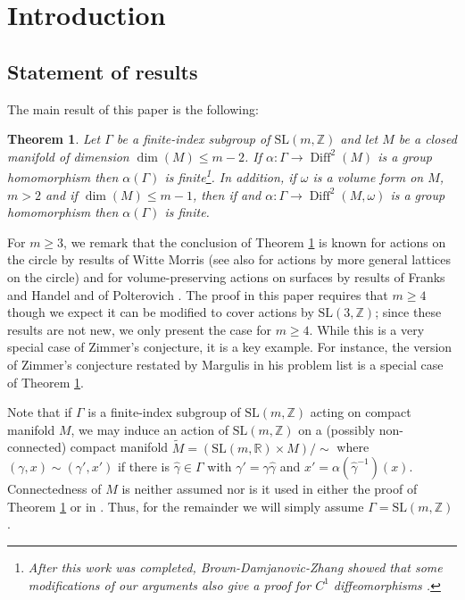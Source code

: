 \documentclass[10pt,reqno]{amsart}
\theoremstyle{Theorem}
\newtheorem{custheorem}{Theorem}
\theoremstyle{definition}
\theoremstyle{remark}
\newcommand{\note}[1]{\marginpar{{\color{red}\footnotesize \begin{spacing}{1}#1\end{spacing}}}}
\newcommand{\td}{\tilde}
\DeclareMathOperator{\Diff}{Diff}
\newcommand{\R}{\mathbb {R}}
\newcommand{\Z}{\mathbb {Z}}
\newcommand{\Sl}{\mathrm{SL}}
\newcommand{\inv}{^{-1}}
\begin{document}
\section{Introduction}
\subsection{Statement of results}
The main result of this paper is the following:

\begin{custheorem}\label{main1} Let $\Gamma$ be a finite-index subgroup of $\Sl(m,\Z)$ and  let $M$ be a closed manifold of dimension $\dim(M) \leq m - 2$.  If  $\alpha\colon \Gamma \to \Diff^2(M)$ is a group homomorphism  then $\alpha(\Gamma)$ is finite\footnote{After this work was completed, Brown-Damjanovic-Zhang showed that some modifications of our arguments also give a proof for $C^1$ diffeomorphisms \cite{BDZ}.}.  In addition, if $\omega$ is a volume form on $M$, $m>2$ and if $\dim(M) \leq m-1$, then if and $\alpha\colon \Gamma \to \Diff^2(M, \omega)$ is a group homomorphism then $\alpha(\Gamma)$ is finite.
\end{custheorem}


For $m\ge 3$, we remark that the conclusion of Theorem \ref{main1} is known for actions on the circle by results of Witte Morris  \cite{MR1198459} (see also \cite{MR1703323,MR1911660} for actions by more general lattices on the circle) and for volume-preserving actions on surfaces by results of Franks and Handel and of Polterovich  \cite{MR2219247, MR1946555}.   The proof in this paper  requires that $m\ge 4$ though we expect it can be modified to cover actions by $\Sl(3,\Z)$; since these results are not new, we only present the case for $m\ge 4$.  While this is a very special case of Zimmer's conjecture, it is a key example.  For instance, the version of Zimmer's conjecture restated by Margulis in his problem list \cite{MR1754775} is a special case of Theorem \ref{main1}.

Note that if $\Gamma$ is a finite-index subgroup of  $\Sl(m,\Z)$ acting on compact manifold $M$, we may induce an action of $\Sl(m,\Z)$  on a (possibly non-connected) compact manifold $\td M= (\Sl(m,\R)\times M)/\sim$ where $(\gamma,x)\sim (\gamma', x')$ if there is $\hat \gamma\in \Gamma$ with $\gamma' = \gamma \hat \gamma$ and $x' = \alpha(\hat \gamma\inv)(x)$.
Connectedness of $M$ is neither assumed nor is it  used in either the proof of Theorem \ref{main1} or in \cite{BFH}.  Thus, for the remainder we will simply  assume $\Gamma = \Sl(m,\Z)$.
\end{document}
